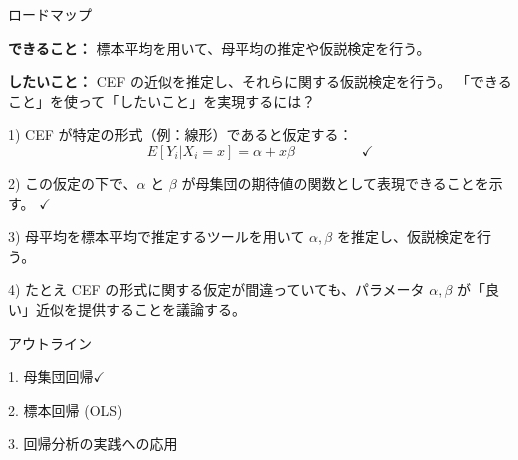 \documentclass[11pt,handout]{beamer}
\newenvironment{wideitemize}{\itemize\addtolength{\itemsep}{10pt}}{\enditemize}
\begin{document}
\begin{frame}{ロードマップ}
	\begin{wideitemize}
		\item \textbf{できること：} 標本平均を用いて、母平均の推定や仮説検定を行う。
		\item \textbf{したいこと：} CEF の近似を推定し、それらに関する仮説検定を行う。
	\end{wideitemize}
	\bigskip
	「できること」を使って「したいこと」を実現するには？

	\begin{wideitemize}
		\item 1) CEF が特定の形式（例：線形）であると仮定する：
		$$E[Y_i | X_i = x] = \alpha + x \beta \hspace{2cm }\checkmark$$
		
		\item 2) この仮定の下で、$\alpha$ と $\beta$ が母集団の期待値の関数として表現できることを示す。 $\checkmark$
		
		\item
		3) 母平均を標本平均で推定するツールを用いて $\alpha,\beta$ を推定し、仮説検定を行う。
		
		\item
		4) たとえ CEF の形式に関する仮定が間違っていても、パラメータ $\alpha,\beta$ が「良い」近似を提供することを議論する。
	\end{wideitemize}
	
\end{frame}

\begin{frame}{アウトライン}

\textcolor{red!75!green!50!blue!25!gray}{1. 母集団回帰}$\checkmark$
\vspace{0.8cm}

2. 標本回帰 (OLS)
\vspace{0.8cm}

\textcolor{red!75!green!50!blue!25!gray}{3. 回帰分析の実践への応用}

\end{frame}
\end{document}
